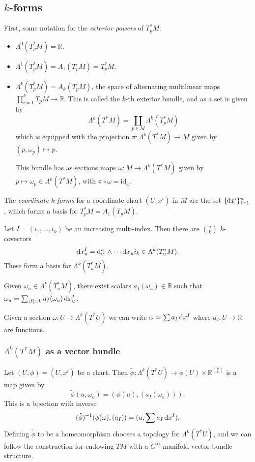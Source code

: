 \subsection{$k$-forms}
First, some notation for the \emph{exterior powers} of $T_p^\ast M$.
\begin{itemize}
  \item{
    $\Lambda^0(T_p^\ast M) = \mathbb{R}$.
  }
  \item{
    $\Lambda^1(T_p^\ast M) = A_1(T_p M) = T_p^\ast M$.
  }
  \item{
    $\Lambda^k(T_p^\ast M) = A_k(T_p M)$,
    the space of alternating multilinear maps
    $\prod_{i=1}^k T_pM \to \mathbb{R}$. This is called the
    $k$-th exterior bundle, and as a set is given by
    $$
      \Lambda^k(T^\ast M)
    = \coprod_{p \in M} \Lambda^k(T_p^\ast M)
    $$
    which is equipped with the projection
    $\pi: \Lambda^k(T^\ast M) \to M$ given by
    $(p, \omega_p) \mapsto p$.

    This bundle has as sections maps
    $\omega : M \to \Lambda^k(T^\ast M)$ given by
    $p \mapsto \omega_p \in \Lambda^k(T^\ast M)$, with
    $\pi \circ \omega = \mathrm{id}_\omega$.
  }
\end{itemize}
The \emph{coordinate $k$-forms} for a coordinate chart
$(U, x^i)$ in $M$ are the set
$\{ \mathop{}\!\mathrm{d} x^i \}_{i=1}^n$, which forms a basis for
$T_p^\ast M = A_1(T_p M)$.

Let $I = (i_1, \dots, i_k)$ be an increasing multi-index. Then
there are ${n \choose k}$ $k$-covectors
$$
  \mathop{}\!\mathrm{d} x_u^I
= \mathop{}\!\mathrm{d}_u^{i_1} \wedge \cdots \mathop{}\!\mathrm{d} x_u{i_k}
\in \Lambda^k(T_u^\ast M).
$$
These form a basis for $\Lambda^k(T_u^\ast M)$.

Given $\omega_u \in \Lambda^k(T_u^\ast M)$, there exist scalars
$a_I(\omega_u) \in \mathbb{R}$ such that
$\omega_u = \sum_{|I| = k} a_I(\omega_u) \mathop{}\!\mathrm{d} x_u^I$.

Given a section $\omega: U \to \Lambda^k(T^\ast U)$
we can write $\omega = \sum a_I \mathop{}\!\mathrm{d} x^I$ where
$a_I: U \to \mathbb{R}$ are functions.

\subsubsection{$\Lambda^k(T^\ast M)$ as a vector bundle}
Let $(U, \phi) = (U, x^i)$ be a chart. Then
$\tilde{\phi} : \Lambda^k(T^\ast U) \to \phi(U) \times
\mathbb{R}^{{n \choose k}}$ is a map given by
$$
  \tilde{\phi}(u, \omega_u)
= (\phi(u), (a_I(\omega_u))).
$$
This is a bijection with inverse
$$
  (\tilde{\phi})^{-1}(\phi(\omega), (a_I))
= (u, \sum a_I \mathop{}\!\mathrm{d} x^I).
$$
Defining $\tilde{\phi}$ to be a homeomorphism chooses a topology for
$\Lambda^k(T^\ast U)$, and we can follow the construction for
endowing $TM$ with a $C^\infty$ manifold vector bundle structure.

